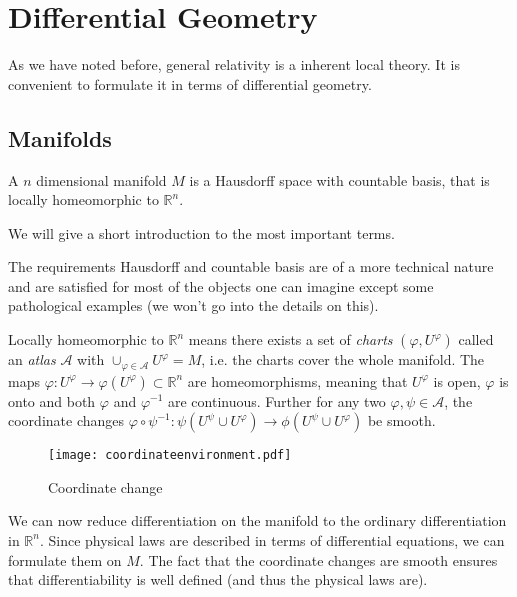 \chapter{Differential Geometry}
As we have noted before, general relativity is a inherent local theory. It is
convenient to formulate it in terms of differential geometry.
\section{Manifolds}
\begin{definition}
A $n$ dimensional manifold $M$ is a Hausdorff space with countable basis, that
is locally homeomorphic to $\mathbb{R}^n$. 
\end{definition}
We will give a short introduction to
the most important terms.
\begin{remark}
The requirements Hausdorff and countable basis are of a more technical nature and are satisfied for most of the objects one can imagine 
except some pathological examples (we won't go into the details on this).

Locally homeomorphic to $\mathbb{R}^n$ means there exists a set of \emph{charts} 
$(\varphi,U^\varphi)$ called an \emph{atlas} $\mathcal{A}$ with $\cup_{\varphi\in\mathcal{A}} U^\varphi =M$, 
i.e. the charts cover the whole manifold. The maps $\varphi:U^\varphi\to \varphi(U^\varphi)\subset\mathbb{R}^n $ are homeomorphisms, 
meaning that $U^\varphi$ is open, $\varphi$ is onto and both $\varphi$ and
$\varphi^{-1}$ are continuous.
Further for any two $\varphi,\psi\in \mathcal{A}$, the coordinate changes 
$\varphi\circ\psi^{-1}:\psi(U^\psi\cup U^\varphi)\to \phi(U^\psi\cup U^\varphi)$
be smooth\footnotemark .
\end{remark}
\begin{figure}[hbtp!]
\centering
 \texttt{[image: coordinateenvironment.pdf]}
\caption{Coordinate change}
\end{figure}

We can now reduce differentiation on the manifold to the ordinary differentiation in $\mathbb{R}^n$. 
Since physical laws are described in terms of differential equations, we can formulate them on $M$. 
The fact that the coordinate changes are smooth ensures that differentiability
is well defined (and thus the physical laws are).

